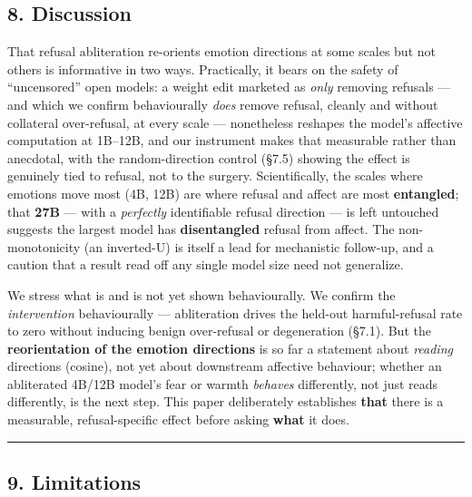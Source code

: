 \documentclass[
]{article}
\newcounter{none} %
\begin{document}
\subsection{8. Discussion}\label{discussion}

That refusal abliteration re-orients emotion directions at some scales
but not others is informative in two ways. Practically, it bears on the
safety of ``uncensored'' open models: a weight edit marketed as
\emph{only} removing refusals --- and which we confirm behaviourally
\emph{does} remove refusal, cleanly and without collateral over-refusal,
at every scale --- nonetheless reshapes the model's affective
computation at 1B--12B, and our instrument makes that measurable rather
than anecdotal, with the random-direction control (§7.5) showing the
effect is genuinely tied to refusal, not to the surgery. Scientifically,
the scales where emotions move most (4B, 12B) are where refusal and
affect are most \textbf{entangled}; that \textbf{27B} --- with a
\emph{perfectly} identifiable refusal direction --- is left untouched
suggests the largest model has \textbf{disentangled} refusal from
affect. The non-monotonicity (an inverted-U) is itself a lead for
mechanistic follow-up, and a caution that a result read off any single
model size need not generalize.

We stress what is and is not yet shown behaviourally. We confirm the
\emph{intervention} behaviourally --- abliteration drives the held-out
harmful-refusal rate to zero without inducing benign over-refusal or
degeneration (§7.1). But the \textbf{reorientation of the emotion
directions} is so far a statement about \emph{reading} directions
(cosine), not yet about downstream affective behaviour; whether an
abliterated 4B/12B model's fear or warmth \emph{behaves} differently,
not just reads differently, is the next step. This paper deliberately
establishes \textbf{that} there is a measurable, refusal-specific effect
before asking \textbf{what} it does.

\begin{center}\rule{0.5\linewidth}{0.5pt}\end{center}

\subsection{9. Limitations}\label{limitations}
\end{document}
